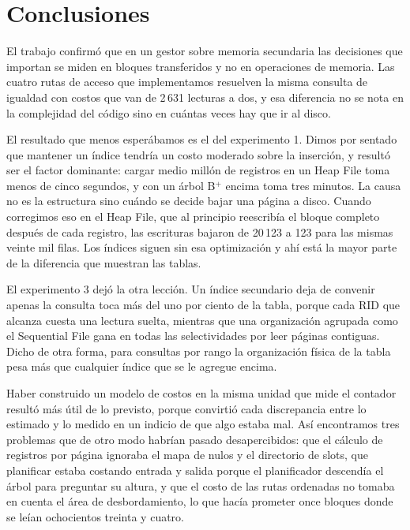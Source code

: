 \documentclass[a4paper,12pt]{article}
\begin{document}






\section{Conclusiones}

El trabajo confirmó que en un gestor sobre memoria secundaria las decisiones que
importan se miden en bloques transferidos y no en operaciones de memoria. Las
cuatro rutas de acceso que implementamos resuelven la misma consulta de igualdad
con costos que van de 2\,631 lecturas a dos, y esa diferencia no se nota en la
complejidad del código sino en cuántas veces hay que ir al disco.

El resultado que menos esperábamos es el del experimento 1. Dimos por sentado
que mantener un índice tendría un costo moderado sobre la inserción, y resultó
ser el factor dominante: cargar medio millón de registros en un Heap File toma
menos de cinco segundos, y con un árbol B$^+$ encima toma tres minutos. La causa
no es la estructura sino cuándo se decide bajar una página a disco. Cuando
corregimos eso en el Heap File, que al principio reescribía el bloque completo
después de cada registro, las escrituras bajaron de 20\,123 a 123 para las
mismas veinte mil filas. Los índices siguen sin esa optimización y ahí está la
mayor parte de la diferencia que muestran las tablas.

El experimento 3 dejó la otra lección. Un índice secundario deja de convenir
apenas la consulta toca más del uno por ciento de la tabla, porque cada RID que
alcanza cuesta una lectura suelta, mientras que una organización agrupada como
el Sequential File gana en todas las selectividades por leer páginas contiguas.
Dicho de otra forma, para consultas por rango la organización física de la tabla
pesa más que cualquier índice que se le agregue encima.

Haber construido un modelo de costos en la misma unidad que mide el contador
resultó más útil de lo previsto, porque convirtió cada discrepancia entre lo
estimado y lo medido en un indicio de que algo estaba mal. Así encontramos tres
problemas que de otro modo habrían pasado desapercibidos: que el cálculo de
registros por página ignoraba el mapa de nulos y el directorio de slots, que
planificar estaba costando entrada y salida porque el planificador descendía el
árbol para preguntar su altura, y que el costo de las rutas ordenadas no tomaba
en cuenta el área de desbordamiento, lo que hacía prometer once bloques donde se
leían ochocientos treinta y cuatro.
\end{document}
